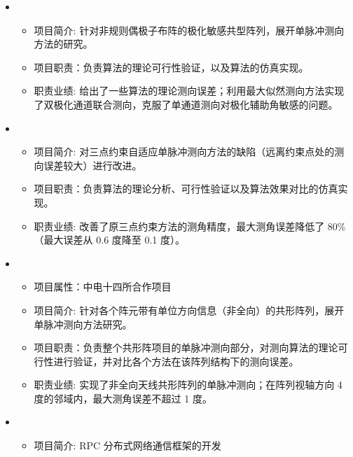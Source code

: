   \begin{itemize}[leftmargin=*]
    \item
      {\small
      \begin{itemize}
        \item 项目简介: 针对非规则偶极子布阵的极化敏感共型阵列，展开单脉冲测向方法的研究。
        \item 项目职责：负责算法的理论可行性验证，以及算法的仿真实现。
        \item 职责业绩: 给出了一些算法的理论测向误差；利用最大似然测向方法实现了双极化通道联合测向，克服了单通道测向对极化辅助角敏感的问题。
      \end{itemize}
        }
    \item
      {\small
      \begin{itemize}
        \item 项目简介: 对三点约束自适应单脉冲测向方法的缺陷（远离约束点处的测向误差较大）进行改进。
        \item 项目职责：负责算法的理论分析、可行性验证以及算法效果对比的仿真实现。
        \item 职责业绩: 改善了原三点约束方法的测角精度，最大测角误差降低了 80\%（最大误差从 0.6 度降至 0.1 度）。
      \end{itemize}
      }
    \item
    {\small
    \begin{itemize}
      \item 项目属性：中电十四所合作项目
      \item 项目简介: 针对各个阵元带有单位方向信息（非全向）的共形阵列，展开单脉冲测向方法研究。
      \item 项目职责：负责整个共形阵项目的单脉冲测向部分，对测向算法的理论可行性进行验证，并对比各个方法在该阵列结构下的测向误差。
      \item 职责业绩: 实现了非全向天线共形阵列的单脉冲测向；在阵列视轴方向 4 度的邻域内，最大测角误差不超过 1 度。
    \end{itemize}
    }
    \item 
    {\small
    \begin{itemize}
      \item 项目简介: RPC 分布式网络通信框架的开发

\end{itemize}}
\end{itemize}
